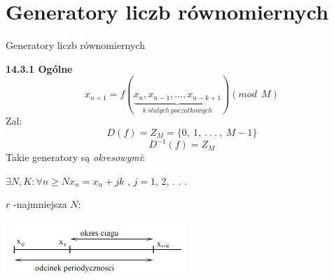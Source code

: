 ﻿\section{Generatory liczb równomiernych}
	\begin{frame}{Generatory liczb równomiernych}


	\textbf{14.3.1 Ogólne}
	\[          
	x_{n+1}=f(\underbrace{x_{n},x_{n-1},\ldots,x_{n-k+1}}_{k \:stalych\: poczatkowych}) (mod\ \ M) 
	\]
	Zal:
	$$
	D(f)=Z_{M}=\{0,\ 1,\ .\ .\ .\ ,\ M-1\}
	$$
	$$
	D^{-1}(f)=Z_{M}
	$$
	Takie generatory są {\it okresowymi}:
	\begin{center}
	$\exists N, K:\forall n\geq N x_{n}=x_{n}+jk$ , $j=1$, 2, . . .
	\end{center}
	$r$ -najmniejsza $N$:
    \begin{center}
	\includegraphics[width=70mm,height=20mm]{img/14/14_3_1_img}
	\end{center}
	\end{frame}
   	
